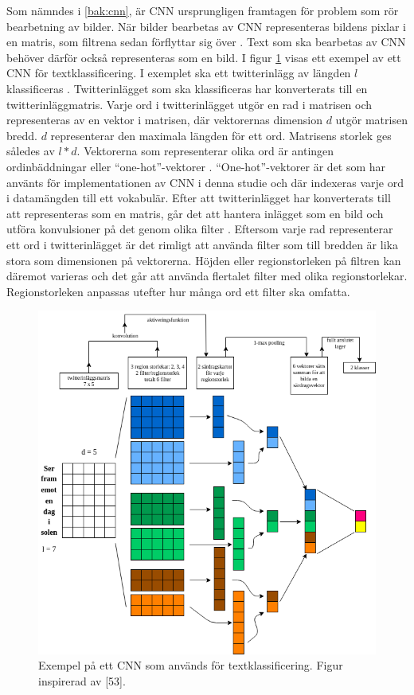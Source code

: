 \documentclass{kaumasters} %
\begin{document}
Som nämndes i \ref{bak:cnn}, är CNN ursprungligen framtagen för problem som rör bearbetning av bilder. När bilder bearbetas av CNN representeras bildens pixlar i en matris, som filtrena sedan förflyttar sig över \cite{cnn:004}. Text som ska bearbetas av CNN behöver därför också representeras som en bild. I figur \ref{fig:cnntext} visas ett exempel av ett CNN för textklassificering. I exemplet ska ett twitterinlägg av längden $l$ klassificeras \cite{cnn:002}. Twitterinlägget som ska klassificeras har konverterats till en twitterinläggmatris. Varje ord i twitterinlägget utgör en rad i matrisen och representeras av en vektor i matrisen, där vektorernas dimension $d$ utgör matrisen bredd. $d$ representerar den maximala längden för ett ord.  Matrisens storlek ges således av $l*d$. Vektorerna som representerar olika ord är antingen ordinbäddningar \cite{wiki:016} eller “one-hot”-vektorer \cite{cnn:004}. “One-hot”-vektorer är det som har använts för implementationen av CNN i denna studie och där indexeras varje ord i datamängden till ett vokabulär. Efter att twitterinlägget har konverterats till att representeras som en matris, går det att hantera inlägget som en bild och utföra konvulsioner på det genom olika filter \cite{cnn:002}. Eftersom varje rad representerar ett ord i twitterinlägget är det rimligt att använda filter som till bredden är lika stora som dimensionen på vektorerna. Höjden eller regionstorleken på filtren kan däremot varieras och det går att använda flertalet filter med olika regionstorlekar. Regionstorleken anpassas utefter hur många ord ett filter ska omfatta. 

\begin{figure}[H]
\includegraphics[width=12cm]{cnn_text}
\centering
\caption{Exempel på ett CNN som används för textklassificering. Figur inspirerad av [53].}
\label{fig:cnntext}
\end{figure}
\end{document}
